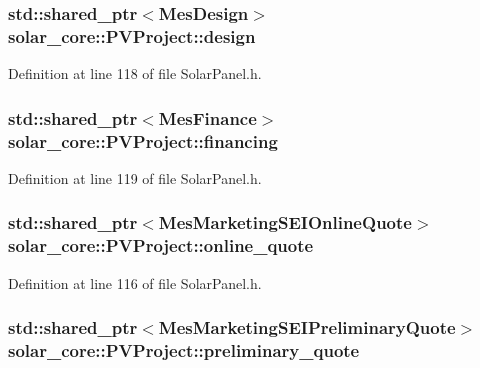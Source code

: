 \subsubsection[{design}]{\setlength{\rightskip}{0pt plus 5cm}std\+::shared\+\_\+ptr$<${\bf Mes\+Design}$>$ solar\+\_\+core\+::\+P\+V\+Project\+::design}\label{classsolar__core_1_1_p_v_project_a0e3e8228c8129ccd07e44503ef8577a8}


Definition at line 118 of file Solar\+Panel.\+h.

\hypertarget{classsolar__core_1_1_p_v_project_adf809769d8d38859f2f766fb5332b946}{}
\subsubsection[{financing}]{\setlength{\rightskip}{0pt plus 5cm}std\+::shared\+\_\+ptr$<${\bf Mes\+Finance}$>$ solar\+\_\+core\+::\+P\+V\+Project\+::financing}\label{classsolar__core_1_1_p_v_project_adf809769d8d38859f2f766fb5332b946}


Definition at line 119 of file Solar\+Panel.\+h.

\hypertarget{classsolar__core_1_1_p_v_project_ae7998ae898c0230fbde18818cfd088a1}{}
\subsubsection[{online\+\_\+quote}]{\setlength{\rightskip}{0pt plus 5cm}std\+::shared\+\_\+ptr$<${\bf Mes\+Marketing\+S\+E\+I\+Online\+Quote}$>$ solar\+\_\+core\+::\+P\+V\+Project\+::online\+\_\+quote}\label{classsolar__core_1_1_p_v_project_ae7998ae898c0230fbde18818cfd088a1}


Definition at line 116 of file Solar\+Panel.\+h.

\hypertarget{classsolar__core_1_1_p_v_project_a5d75e9dfe664f7307b0dc24c1f00d8a9}{}
\subsubsection[{preliminary\+\_\+quote}]{\setlength{\rightskip}{0pt plus 5cm}std\+::shared\+\_\+ptr$<${\bf Mes\+Marketing\+S\+E\+I\+Preliminary\+Quote}$>$ solar\+\_\+core\+::\+P\+V\+Project\+::preliminary\+\_\+quote}\label{classsolar__core_1_1_p_v_project_a5d75e9dfe664f7307b0dc24c1f00d8a9}


